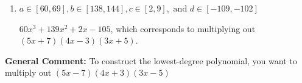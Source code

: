 \documentclass{extbook}[14pt]
\begin{document}
\begin{enumerate}
{\begin{enumerate}[label=\Alph*.]
$60x^{3} +29 x^{2} -152 x -105$, which corresponds to multiplying out $(5x + 7)(4x + 3)(3x -5)$.
\item \( a \in [60, 69], b \in [138, 144], c \in [2, 9], \text{ and } d \in [-109, -102] \)

$60x^{3} +139 x^{2} +2 x -105$, which corresponds to multiplying out $(5x + 7)(4x -3)(3x + 5)$.
\end{enumerate}

\textbf{General Comment:} To construct the lowest-degree polynomial, you want to multiply out $(5x -7)(4x + 3)(3x -5)$
}
\end{enumerate}
\end{document}
